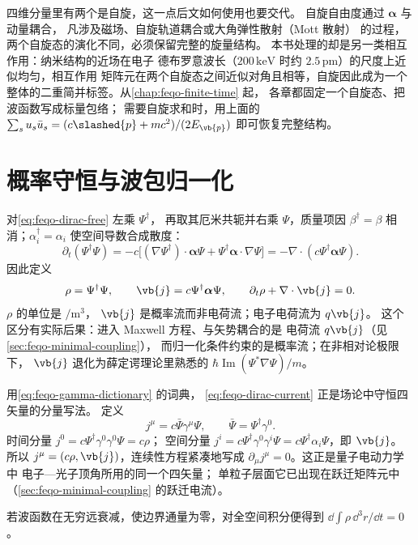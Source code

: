 四维分量里有两个是自旋，这一点后文如何使用也要交代。
自旋自由度通过 \(\boldsymbol\alpha\) 与动量耦合，
凡涉及磁场、自旋轨道耦合或大角弹性散射（Mott 散射）
的过程，两个自旋态的演化不同，必须保留完整的旋量结构。
本书处理的却是另一类相互作用：纳米结构的近场在电子
德布罗意波长（\(200\,\si{\kilo\electronvolt}\) 时约
\(2.5\,\si{\pico\metre}\)）的尺度上近似均匀，相互作用
矩阵元在两个自旋态之间近似对角且相等，自旋因此成为一个
整体的二重简并标签。从\cref{chap:feqo-finite-time} 起，
各章都固定一个自旋态、把波函数写成标量包络；
需要自旋求和时，用上面的
\(\sum_su_s\bar u_s=(c\slashed{p}+mc^2)/(2E_{\vb{p}})\)
即可恢复完整结构。


\section{概率守恒与波包归一化}
\label{sec:feqo-current-and-packet}

对\cref{eq:feqo-dirac-free} 左乘 \(\Psi^\dagger\)，
再取其厄米共轭并右乘 \(\Psi\)，质量项因 \(\beta^\dagger=\beta\)
相消；\(\alpha_i^\dagger=\alpha_i\) 使空间导数合成散度：
\[
\partial_t(\Psi^\dagger\Psi)
=-c\bigl[(\nabla\Psi^\dagger)\cdot\boldsymbol\alpha\Psi
+\Psi^\dagger\boldsymbol\alpha\cdot\nabla\Psi\bigr]
=-\nabla\cdot(c\Psi^\dagger\boldsymbol\alpha\Psi).
\]
因此定义
\begin{equation}
\rho=\Psi^\dagger\Psi,\qquad
\vb{j}=c\Psi^\dagger\boldsymbol\alpha\Psi,\qquad
\partial_t\rho+\nabla\cdot\vb{j}=0.
\label{eq:feqo-dirac-current}
\end{equation}
\(\rho\) 的单位是 \(\si{\per\cubic\metre}\)，
\(\vb{j}\) 是概率流而非电荷流；电子电荷流为 \(q\vb{j}\)。
这个区分有实际后果：进入 Maxwell 方程、与矢势耦合的是
电荷流 \(q\vb{j}\)（见\cref{sec:feqo-minimal-coupling}），
而归一化条件约束的是概率流；在非相对论极限下，
\(\vb{j}\) 退化为薛定谔理论里熟悉的
\(\hbar\operatorname{Im}(\Psi^*\nabla\Psi)/m\)。

用\cref{eq:feqo-gamma-dictionary} 的词典，
\cref{eq:feqo-dirac-current} 正是场论中守恒四矢量的分量写法。
定义
\[
j^\mu=c\bar\Psi\gamma^\mu\Psi,\qquad
\bar\Psi=\Psi^\dagger\gamma^0 .
\]
时间分量 \(j^0=c\Psi^\dagger\gamma^0\gamma^0\Psi=c\rho\)；
空间分量 \(j^i=c\Psi^\dagger\gamma^0\gamma^i\Psi
=c\Psi^\dagger\alpha_i\Psi\)，即 \(\vb{j}\)。
所以 \(j^\mu=(c\rho,\vb{j})\)，连续性方程紧凑地写成
\(\partial_\mu j^\mu=0\)。这正是量子电动力学中
电子—光子顶角所用的同一个四矢量；
单粒子层面它已出现在跃迁矩阵元中
（\cref{sec:feqo-minimal-coupling} 的跃迁电流）。

若波函数在无穷远衰减，使边界通量为零，对全空间积分便得到
\(\dd\int\rho\,\dd^3r/\dd t=0\)。

